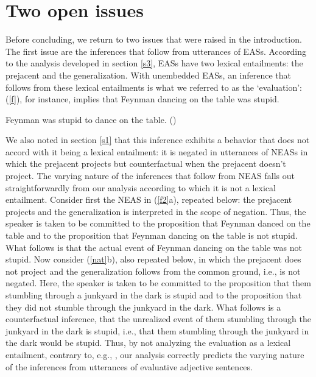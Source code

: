 \documentclass[11pt,fleqn]{article}
\newcommand{\6}{\mbox{$[\hspace*{-.6mm}[$}}
\newcommand{\9}{\mbox{$]\hspace*{-.6mm}]$}}
\begin{document}
\section{Two open issues}\label{s5}

Before concluding, we return to two issues that were raised in the introduction. The first issue are the inferences that follow from utterances of EASs. According to the analysis developed in section \ref{s3}, EASs have two lexical entailments: the prejacent and the generalization. With unembedded EASs, an inference that follows from these lexical entailments is what we referred to as the `evaluation': (\ref{f}), for instance, implies that Feynman dancing on the table was stupid. 

\begin{exe} 
\exi{(\ref{f})} Feynman was stupid to dance on the table. \hfill (\citealt[18]{barker02})

\end{exe} 
We also noted in section \ref{s1} that this inference exhibits a behavior that does not accord with it being a lexical entailment: it is negated in utterances of NEASs in which the prejacent projects but counterfactual when the prejacent doesn't project. The varying nature of the inferences that follow from NEAS falls out straightforwardly from our analysis according to which it is not a lexical entailment. Consider first the NEAS in  (\ref{f2}a), repeated below: the prejacent projects and the generalization is interpreted in the scope of negation. Thus, the speaker is taken to be committed to the proposition that Feynman danced on the table and to the proposition that Feynman dancing on the table is not stupid. What follows is that the actual event of Feynman dancing on the table was not stupid. Now consider (\ref{nat}b), also repeated below, in which the prejacent does not project and the generalization follows from the common ground, i.e., is not negated. Here, the speaker is taken to be committed to the proposition that them stumbling through a junkyard in the dark is stupid and to the proposition that they did not stumble through the junkyard in the dark. What follows is a counterfactual inference, that the unrealized event of them stumbling through the junkyard in the dark is stupid, i.e., that them stumbling through the junkyard in the dark would be stupid. Thus, by not analyzing the evaluation as a lexical entailment, contrary to, e.g., \citealt{barker02}, our analysis correctly predicts the varying nature of the inferences from utterances of evaluative adjective sentences.
\end{document}
